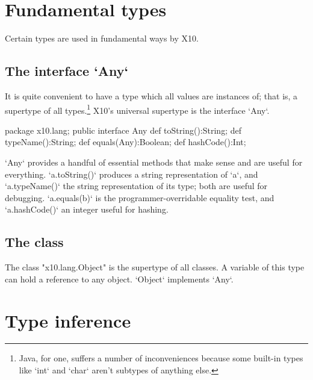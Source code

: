 {\begin{itemize}
\end{itemize}


\section{Fundamental types}

Certain types are used in fundamental ways by X10.  

\subsection{The interface \xcd`Any`}

It is quite convenient to have a type which all values are instances of; that
is, a supertype of all types.\footnote{Java, for one, suffers a number of
  inconveniences because some built-in types like \xcd`int` and \xcd`char`
  aren't subtypes of anything else.}  X10's universal supertype is the
  interface \xcd`Any`. 

\begin{xten}
package x10.lang;
public interface Any {
  def toString():String;
  def typeName():String;
  def equals(Any):Boolean;
  def hashCode():Int;
}
\end{xten}

\xcd`Any` provides a handful of essential methods that make sense and are
useful for everything. \xcd`a.toString()` produces a
string representation of \xcd`a`, and \xcd`a.typeName()` the string
representation of its type; both are useful for debugging.  \xcd`a.equals(b)`
is the programmer-overridable equality test, and \xcd`a.hashCode()` an integer
useful for hashing.  


\subsection{The class }
\label{Object}

The class \xcd"x10.lang.Object" is the supertype of all classes.
A variable of this type can hold a reference to any object.
\xcd`Object` implements \xcd`Any`.



\section{Type inference}
\label{TypeInference}

}

